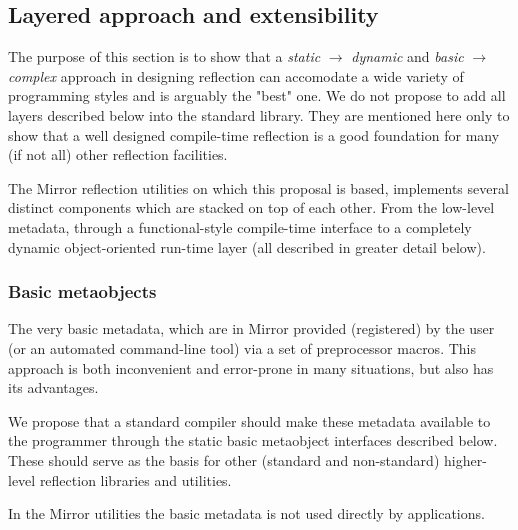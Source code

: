 \subsection{Layered approach and extensibility}

The purpose of this section is to show that a {\em static} $\to$ {\em dynamic}
and {\em basic} $\to$ {\em complex} approach in designing reflection
can accomodate a wide variety of programming styles and is arguably
the "best" one. We do not propose to add all layers described
below into the standard library. They are mentioned here only to
show that a well designed compile-time reflection is a good foundation
for many (if not all) other reflection facilities.

The Mirror reflection utilities \cite{mirror-doc-cpp11} on which this
proposal is based, implements several distinct components which
are stacked on top of each other. From the low-level metadata, through
a functional-style compile-time interface to a completely dynamic
object-oriented run-time layer (all described in greater detail below).

\subsubsection{Basic metaobjects}
The very basic metadata, which are in Mirror
provided (registered) by the user (or an automated command-line tool) via a set
of preprocessor macros. This approach is both inconvenient and error-prone
in many situations, but also has its advantages.

We propose that a standard compiler should make these metadata available
to the programmer through the static basic metaobject interfaces described
below. These should serve as the basis for other (standard and non-standard)
higher-level reflection libraries and utilities.

In the Mirror utilities the basic metadata is not used directly by
applications.





